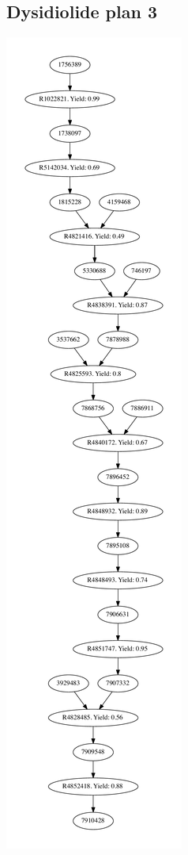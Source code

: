 \documentclass[a4paper,10pt,titlepage]{paper}
\begin{document}
\subsection{Dysidiolide plan 3}
\centering
\includegraphics[scale=0.4]{Synteseplaner/Dysidiolide/plan3.pdf}
\label{Appendix::Dysidiolide3}
\end{document}
